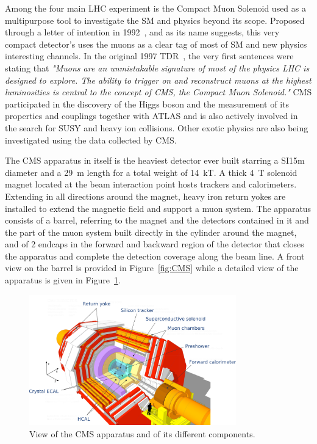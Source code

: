 	Among the four main LHC experiment is the Compact Muon Solenoid used as a multipurpose tool to investigate the SM and physics beyond its scope. Proposed through a letter of intention in 1992~\cite{CMSLOI}, and as its name suggests, this very compact detector's uses the muons as a clear tag of most of SM and new physics interesting channels. In the original 1997 \acf{TDR}~\cite{MUONTDR}, the very first sentences were stating that \textit{"Muons are an unmistakable signature of most of the physics LHC is designed to explore. The ability to trigger on and reconstruct muons at the highest luminosities is central to the concept of CMS, the Compact Muon Solenoid."} CMS participated in the discovery of the Higgs boson and the measurement of its properties and couplings together with ATLAS and is also actively involved in the search for SUSY and heavy ion collisions. Other exotic physics are also being investigated using the data collected by CMS.
	
	The CMS apparatus in itself is the heaviest detector ever built starring a SI{15}{m} diameter and a \SI{29}{m} length for a total weight of \SI{14}{kT}. A thick \SI{4}{T} solenoid magnet located at the beam interaction point hosts trackers and calorimeters. Extending in all directions around the magnet, heavy iron return yokes are installed to extend the magnetic field and support a muon system. The apparatus consists of a barrel, referring to the magnet and the detectors contained in it and the part of the muon system built directly in the cylinder around the magnet, and of 2 endcaps in the forward and backward region of the detector that closes the apparatus and complete the detection coverage along the beam line. A front view on the barrel is provided in Figure~\ref{fig:CMS} while a detailed view of the apparatus is given in Figure~\ref{fig:CMS-detail}.
	
	\begin{figure}[H]
		\centering
		\includegraphics[width=0.8\textwidth]{fig/chapt2/CMS_detail.pdf}
		\caption{\label{fig:CMS-detail} View of the CMS apparatus and of its different components.}
	\end{figure}
	
